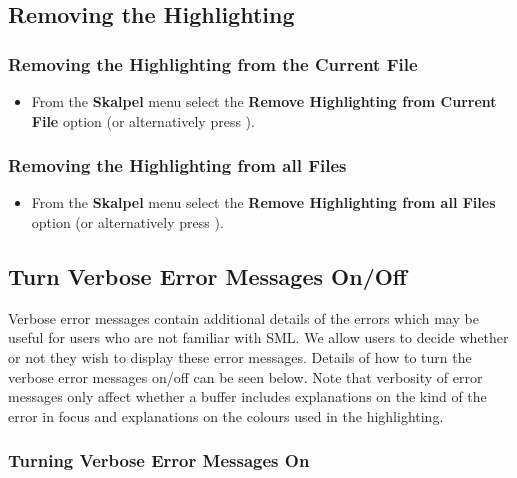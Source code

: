 \documentclass{report}
\begin{document}

\subsection{Removing the Highlighting}

\subsubsection{Removing the Highlighting from the Current File}

\begin{itemize}
\item From the \textbf{Skalpel} menu select the \textbf{Remove
  Highlighting from Current File} option (or alternatively press
  ).
\end{itemize}

\subsubsection{Removing the Highlighting from all Files}

\begin{itemize}
\item From the \textbf{Skalpel} menu select the \textbf{Remove
  Highlighting from all Files} option (or alternatively press
  ).
\end{itemize}


\subsection{Turn Verbose Error Messages On/Off}

Verbose error messages contain additional details of the errors which
may be useful for users who are not familiar with SML.  We allow users
to decide whether or not they wish to display these error messages.
Details of how to turn the verbose error messages on/off can be seen
below.  Note that verbosity of error messages only affect whether a
buffer includes explanations on the kind of the error in focus and
explanations on the colours used in the highlighting.

\subsubsection{Turning Verbose Error Messages On}
\end{document}
